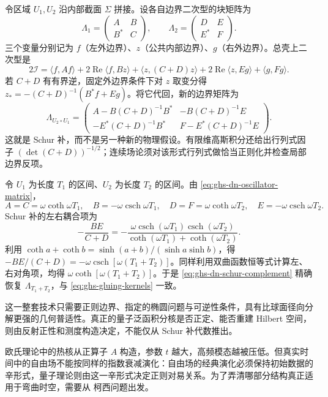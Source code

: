 令区域 $U_1,U_2$ 沿内部截面 $\Sigma$ 拼接。设各自边界二次型的块矩阵为
\[
 \Lambda_1=\begin{pmatrix}A&B\\B^*&C\end{pmatrix},
 \qquad \Lambda_2=\begin{pmatrix}D&E\\E^*&F\end{pmatrix}.
\]
三个变量分别记为 $f$（左外边界）、$z$（公共内部边界）、$g$（右外边界）。总壳上二次型是
\[
 2\mathscr I=\langle f,Af\rangle+2\operatorname{Re}\langle f,Bz\rangle
 +\langle z,(C+D)z\rangle+2\operatorname{Re}\langle z,Eg\rangle+\langle g,Fg\rangle.
\]
若 $C+D$ 有有界逆，固定外边界条件下对 $z$ 取变分得
$z_*=-(C+D)^{-1}(B^*f+Eg)$。将它代回，新的边界矩阵为
\begin{equation}\label{eq:ghs-dn-schur-complement}
 \Lambda_{U_2\circ U_1}=
 \begin{pmatrix}
 A-B(C+D)^{-1}B^*&-B(C+D)^{-1}E\\
 -E^*(C+D)^{-1}B^*&F-E^*(C+D)^{-1}E
 \end{pmatrix}.
\end{equation}
这就是 Schur 补，而不是另一种新的物理假设。有限维高斯积分还给出行列式因子 $(\det(C+D))^{-1/2}$；连续场论须对该形式行列式做恰当正则化并检查局部边界反项。



令 $U_1$ 为长度 $T_1$ 的区间、$U_2$ 为长度 $T_2$ 的区间。由 \cref{eq:ghs-dn-oscillator-matrix}，
\[
 A=C=\omega\coth\omega T_1,
 \quad B=-\omega\operatorname{csch}\omega T_1,
 \quad D=F=\omega\coth\omega T_2,
 \quad E=-\omega\operatorname{csch}\omega T_2.
\]
Schur 补的左右耦合项为
\[
 -\frac{BE}{C+D}=-\frac{\omega\operatorname{csch}(\omega T_1)
 \operatorname{csch}(\omega T_2)}{\coth(\omega T_1)+\coth(\omega T_2)}.
\]
利用 $\coth a+\coth b=\sinh(a+b)/(\sinh a\sinh b)$，得
$-BE/(C+D)=-\omega\operatorname{csch}[\omega(T_1+T_2)]$。同样利用双曲函数恒等式计算左、右对角项，均得 $\omega\coth[\omega(T_1+T_2)]$。于是 \cref{eq:ghs-dn-schur-complement} 精确恢复 $\Lambda_{T_1+T_2}$，与 \cref{eq:ghs-gluing-kernels} 一致。



这一整套技术只需要正则边界、指定的椭圆问题与可逆性条件，具有比球面径向分解更强的几何普适性。真正的量子泛函积分核是否正定、能否重建 Hilbert 空间，则由反射正性和测度构造决定，不能仅从 Schur 补代数推出。








欧氏理论中的热核从正算子 $A$ 构造，参数 $t$ 越大，高频模态越被压低。但真实时间中的自由场不能按同样的指数衰减演化：自由场的经典演化必须保持初始数据的辛形式，量子理论则由这一辛形式决定正则对易关系。为了弄清哪部分结构真正适用于弯曲时空，需要从 柯西问题出发。


